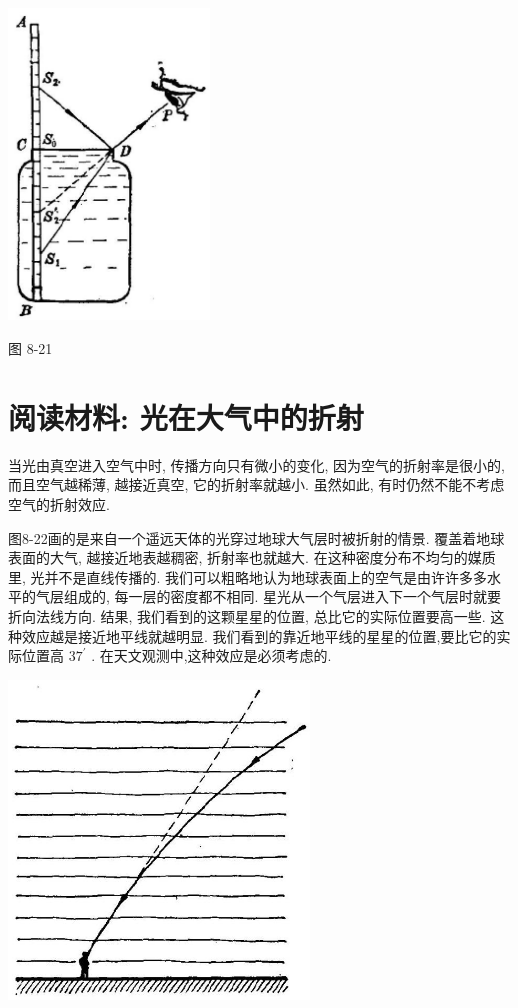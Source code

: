 \documentclass[10pt]{article}
\begin{document}
\begin{center}
\includegraphics[max width=0.4\textwidth]{images/01913056-1f15-74d8-9184-9aab52c9d66b_261_385363.jpg}
\end{center}

图 8-21

\section*{阅读材料: 光在大气中的折射}

当光由真空进入空气中时, 传播方向只有微小的变化, 因为空气的折射率是很小的, 而且空气越稀薄, 越接近真空, 它的折射率就越小. 虽然如此, 有时仍然不能不考虑空气的折射效应.

图8-22画的是来自一个遥远天体的光穿过地球大气层时被折射的情景. 覆盖着地球表面的大气, 越接近地表越稠密, 折射率也就越大. 在这种密度分布不均匀的媒质里, 光并不是直线传播的. 我们可以粗略地认为地球表面上的空气是由许许多多水平的气层组成的, 每一层的密度都不相同. 星光从一个气层进入下一个气层时就要折向法线方向. 结果, 我们看到的这颗星星的位置, 总比它的实际位置要高一些. 这种效应越是接近地平线就越明显. 我们看到的靠近地平线的星星的位置,要比它的实际位置高 \({37}^{\prime }\) . 在天文观测中,这种效应是必须考虑的.

\begin{center}
\includegraphics[max width=0.6\textwidth]{images/01913056-1f15-74d8-9184-9aab52c9d66b_262_993050.jpg}
\end{center}
\end{document}
